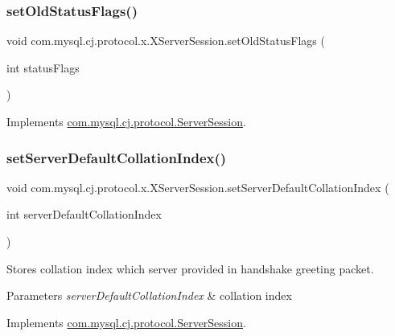 \subsubsection{\texorpdfstring{set\+Old\+Status\+Flags()}{setOldStatusFlags()}}
{\footnotesize\ttfamily void com.\+mysql.\+cj.\+protocol.\+x.\+X\+Server\+Session.\+set\+Old\+Status\+Flags (\begin{DoxyParamCaption}\item[{int}]{status\+Flags }\end{DoxyParamCaption})}



Implements \mbox{\hyperlink{interfacecom_1_1mysql_1_1cj_1_1protocol_1_1_server_session_a8ca3607d493b411a09825465bf202eda}{com.\+mysql.\+cj.\+protocol.\+Server\+Session}}.

\mbox{\label{classcom_1_1mysql_1_1cj_1_1protocol_1_1x_1_1_x_server_session_a2356570d8139fdbd022d253859128cd4}} 
\subsubsection{\texorpdfstring{set\+Server\+Default\+Collation\+Index()}{setServerDefaultCollationIndex()}}
{\footnotesize\ttfamily void com.\+mysql.\+cj.\+protocol.\+x.\+X\+Server\+Session.\+set\+Server\+Default\+Collation\+Index (\begin{DoxyParamCaption}\item[{int}]{server\+Default\+Collation\+Index }\end{DoxyParamCaption})}

Stores collation index which server provided in handshake greeting packet.


\begin{DoxyParams}{Parameters}
{\em server\+Default\+Collation\+Index} & collation index \\
\hline
\end{DoxyParams}


Implements \mbox{\hyperlink{interfacecom_1_1mysql_1_1cj_1_1protocol_1_1_server_session_aa712ac71a0771a45a3f8b46ceaac4178}{com.\+mysql.\+cj.\+protocol.\+Server\+Session}}.

